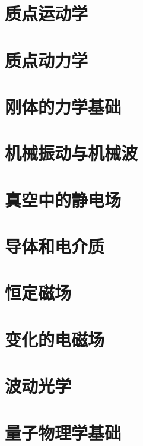 \section{质点运动学}


\section{质点动力学}



\section{刚体的力学基础}


\section{机械振动与机械波}



\section{真空中的静电场}


\section{导体和电介质}


\section{恒定磁场}



\section{变化的电磁场}


\section{波动光学}


\section{量子物理学基础}